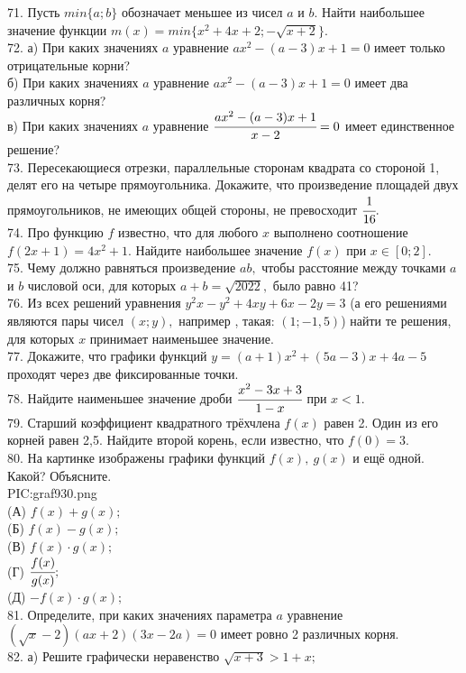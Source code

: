 71. Пусть $min\{a;b\}$ обозначает меньшее из чисел $a$ и $b.$ Найти наибольшее значение функции $m(x)=min\{x^2+4x+2; -\sqrt{x+2}\}.$\\
72. а) При каких значениях $a$ уравнение $ax^2-(a-3)x+1=0$ имеет только отрицательные корни?\\
б) При каких значениях $a$ уравнение $ax^2-(a-3)x+1=0$ имеет два различных корня?\\
в) При каких значениях $a$ уравнение $\cfrac{ax^2-(a-3)x+1}{x-2}=0$ имеет единственное решение?\\
73. Пересекающиеся отрезки, параллельные сторонам квадрата со стороной 1, делят его на четыре прямоугольника. Докажите, что произведение площадей двух прямоугольников, не имеющих общей стороны, не превосходит $\cfrac{1}{16}.$\\
74. Про функцию $f$ известно, что для любого $x$ выполнено соотношение $f(2x+1)=4x^2+1.$ Найдите наибольшее значение $f(x)$ при $x\in[0;2].$\\
75. Чему должно равняться произведение $ab,$ чтобы расстояние между точками $a$ и $b$ числовой оси, для которых $a+b=\sqrt{2022},$ было равно 41?\\
76. Из всех решений уравнения $y^2x-y^2+4xy+6x-2y=3$ (а его решениями являются пары чисел $(x;y),$ например , такая: $(1;-1,5)$) найти те решения, для которых $x$ принимает наименьшее значение.\\
77. Докажите, что графики функций $y=(a+1)x^2+(5a-3)x+4a-5$ проходят через две фиксированные точки.\\
78. Найдите наименьшее значение дроби $\cfrac{x^2-3x+3}{1-x}$ при $x<1.$\\
79. Старший коэффициент квадратного трёхчлена $f(x)$ равен 2. Один из его корней равен 2,5. Найдите второй корень, если известно, что $f(0)=3.$\\
80. На картинке изображены графики функций $f(x),\ g(x)$ и ещё одной. Какой?
Объясните.\\
{{PIC:graf930.png}}\\
(А) $f(x)+g(x);$\\
(Б) $f(x)-g(x);$\\
(В) $f(x)\cdot g(x);$\\
(Г) $\cfrac{f(x)}{g(x)};$\\
(Д) $-f(x)\cdot g(x);$\\
81. Определите, при каких значениях параметра $a$ уравнение $(\sqrt{x}-2)(ax+2)(3x-2a)=0$ имеет ровно 2 различных корня.\\
82. а) Решите графически неравенство $\sqrt{x+3}>1+x;$\\
